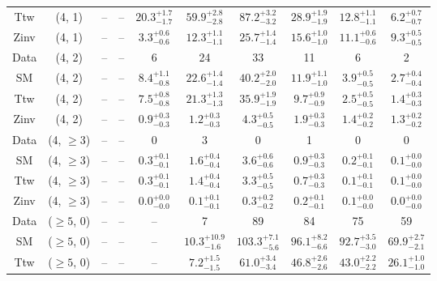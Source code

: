 \begin{table}[h!]
{\begin{tabular}{cccccccccc}
	Ttw & (4, 1) & -- & -- & $20.3^{+ 1.7 }_{- 1.7 }$ & $59.9^{+ 2.8 }_{- 2.8 }$ & $87.2^{+ 3.2 }_{- 3.2 }$ & $28.9^{+ 1.9 }_{- 1.9 }$ & $12.8^{+ 1.1 }_{- 1.1 }$ & $6.2^{+ 0.7 }_{- 0.7 }$ \\[0.5ex] 
	Zinv & (4, 1) & -- & -- & $3.3^{+ 0.6 }_{- 0.6 }$ & $12.3^{+ 1.1 }_{- 1.1 }$ & $25.7^{+ 1.4 }_{- 1.4 }$ & $15.6^{+ 1.0 }_{- 1.0 }$ & $11.1^{+ 0.6 }_{- 0.6 }$ & $9.3^{+ 0.5 }_{- 0.5 }$ \\[0.5ex] 
	Data & (4, 2) & -- & -- & 6 & 24 & 33 & 11 & 6 & 2 \\[0.5ex] 
	SM & (4, 2) & -- & -- & $8.4^{+ 1.1 }_{- 0.8 }$ & $22.6^{+ 1.4 }_{- 1.4 }$ & $40.2^{+ 2.0 }_{- 2.0 }$ & $11.9^{+ 1.1 }_{- 1.0 }$ & $3.9^{+ 0.5 }_{- 0.5 }$ & $2.7^{+ 0.4 }_{- 0.4 }$ \\[0.5ex] 
	Ttw & (4, 2) & -- & -- & $7.5^{+ 0.8 }_{- 0.8 }$ & $21.3^{+ 1.3 }_{- 1.3 }$ & $35.9^{+ 1.9 }_{- 1.9 }$ & $9.7^{+ 0.9 }_{- 0.9 }$ & $2.5^{+ 0.5 }_{- 0.5 }$ & $1.4^{+ 0.3 }_{- 0.3 }$ \\[0.5ex] 
	Zinv & (4, 2) & -- & -- & $0.9^{+ 0.3 }_{- 0.3 }$ & $1.2^{+ 0.3 }_{- 0.3 }$ & $4.3^{+ 0.5 }_{- 0.5 }$ & $1.9^{+ 0.3 }_{- 0.3 }$ & $1.4^{+ 0.2 }_{- 0.2 }$ & $1.3^{+ 0.2 }_{- 0.2 }$ \\[0.5ex] 
	Data & (4, $\ge3$) & -- & -- & 0 & 3 & 0 & 1 & 0 & 0 \\[0.5ex] 
	SM & (4, $\ge3$) & -- & -- & $0.3^{+ 0.1 }_{- 0.1 }$ & $1.6^{+ 0.4 }_{- 0.4 }$ & $3.6^{+ 0.6 }_{- 0.6 }$ & $0.9^{+ 0.3 }_{- 0.3 }$ & $0.2^{+ 0.1 }_{- 0.1 }$ & $0.1^{+ 0.0 }_{- 0.0 }$ \\[0.5ex] 
	Ttw & (4, $\ge3$) & -- & -- & $0.3^{+ 0.1 }_{- 0.1 }$ & $1.4^{+ 0.4 }_{- 0.4 }$ & $3.3^{+ 0.5 }_{- 0.5 }$ & $0.7^{+ 0.3 }_{- 0.3 }$ & $0.1^{+ 0.1 }_{- 0.1 }$ & $0.1^{+ 0.0 }_{- 0.0 }$ \\[0.5ex] 
	Zinv & (4, $\ge3$) & -- & -- & $0.0^{+ 0.0 }_{- 0.0 }$ & $0.1^{+ 0.1 }_{- 0.1 }$ & $0.3^{+ 0.2 }_{- 0.2 }$ & $0.2^{+ 0.1 }_{- 0.1 }$ & $0.1^{+ 0.0 }_{- 0.0 }$ & $0.0^{+ 0.0 }_{- 0.0 }$ \\[0.5ex] 
	Data & ($\ge5$, 0) & -- & -- & -- & 7 & 89 & 84 & 75 & 59 \\[0.5ex] 
	SM & ($\ge5$, 0) & -- & -- & -- & $10.3^{+ 10.9 }_{- 1.6 }$ & $103.3^{+ 7.1 }_{- 5.6 }$ & $96.1^{+ 8.2 }_{- 6.6 }$ & $92.7^{+ 3.5 }_{- 3.0 }$ & $69.9^{+ 2.7 }_{- 2.1 }$ \\[0.5ex] 
	Ttw & ($\ge5$, 0) & -- & -- & -- & $7.2^{+ 1.5 }_{- 1.5 }$ & $61.0^{+ 3.4 }_{- 3.4 }$ & $46.8^{+ 2.6 }_{- 2.6 }$ & $43.0^{+ 2.2 }_{- 2.2 }$ & $26.1^{+ 1.0 }_{- 1.0 }$ \\[0.5ex] 

\end{tabular}}
\end{table}
